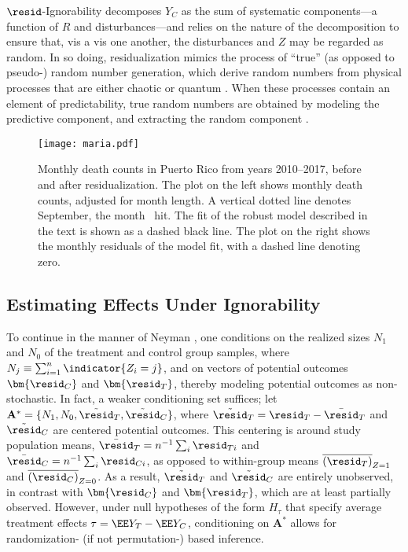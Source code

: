 $\resid$-Ignorability decomposes $Y_C$ as the sum of systematic
components---a function of $R$ and disturbances---and relies on the
nature of the decomposition to ensure
that, vis a vis one another, the disturbances and $Z$ may
be regarded as random.
In so doing, residualization mimics the process of ``true'' (as
opposed to pseudo-) random number generation, which derive random
numbers from physical processes that are either chaotic
\citep[e.g.][]{uchida2008fast} or quantum
\citep[e.g.][]{stefanov2000optical}.
When these processes contain an element
of predictability, %
true random numbers are obtained by modeling the predictive component,
and extracting the random component \citep[see, e.g.][]{Nisan1999148}.

\begin{figure}
\centering
\texttt{[image: maria.pdf]}
\caption{Monthly death counts in Puerto Rico from years 2010--2017, before and after
  residualization. The plot on the left shows monthly death counts,
  adjusted for month length. A vertical dotted line denotes September,
  the month \maria\ hit. The fit of the robust model described in the
  text is shown as a dashed black line. The plot on the right shows
  the monthly residuals of the model fit, with a dashed line denoting
  zero.}
\label{fig:maria}
\end{figure}


\subsection{Estimating Effects Under Ignorability}\label{sec:rand}




To continue in the manner of Neyman
\citeyearpar{neyman:1935}, one conditions on the realized sizes
$N_{1}$ and $N_{0}$ of the treatment and control group samples, where
 $N_{j} \equiv \sum_{i=1}^{n} \indicator{Z_{i}=j}$, and on vectors of
 potential outcomes $\bm{\resid_C}$ and $\bm{\resid_T}$, thereby modeling
 potential outcomes as non-stochastic.
In fact, a weaker conditioning set suffices; let
$\mathbf{A}^{*}=\{N_{1},N_{0},\tilde{\mathbf{\resid}}_{T},\tilde{\mathbf{\resid}}_{C}\}$,
where  $\tilde{\mathbf{\resid}}_{T} = \mathbf{\resid}_{T} - \bar{\resid}_{T}$ and
$\tilde{\mathbf{\resid}}_C$ are centered potential outcomes.
This centering is around study population means,
$\bar{\resid}_{T} = n^{-1}\sum_{i}\resid_{Ti}$ and
$\bar{\resid}_{C} = n^{-1}\sum_{i}\resid_{Ci}$, as opposed to within-group means
$\overline{(\resid_{T})}_{Z=1}$
and
$\overline{(\resid_{C})}_{Z=0}$.
As a result, $\tilde{\mathbf{\resid}}_{T}$ and $\tilde{\mathbf{\resid}}_{C}$ are
entirely unobserved, in contrast with $\bm{\resid_C}$ and $\bm{\resid_T}$, which
are at least partially observed.
However, under null hypotheses of the form $H_\tau$ that specify
average treatment effects $\tau=\EE Y_T-\EE Y_C$, conditioning
on $\mathbf{A}^{*}$ allows for randomization- (if not permutation-)
based inference.

